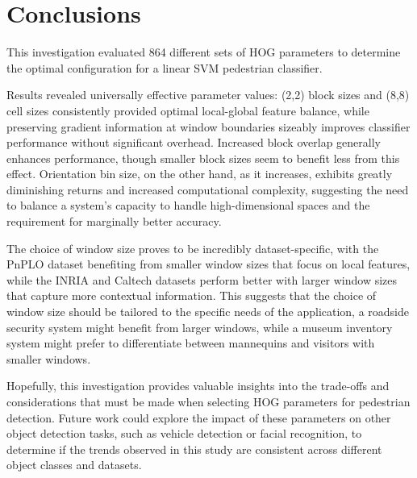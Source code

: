\section{Conclusions}

This investigation evaluated 864 different sets of HOG parameters to determine the optimal configuration for a linear SVM pedestrian classifier.

Results revealed universally effective parameter values: (2,2) block sizes and (8,8) cell sizes consistently provided optimal local-global feature balance, while preserving gradient information at window boundaries sizeably improves classifier performance without significant overhead. Increased block overlap generally enhances performance, though smaller block sizes seem to benefit less from this effect. Orientation bin size, on the other hand, as it increases, exhibits greatly diminishing returns and increased computational complexity, suggesting the need to balance a system's capacity to handle high-dimensional spaces and the requirement for marginally better accuracy.

The choice of window size proves to be incredibly dataset-specific, with the PnPLO dataset benefiting from smaller window sizes that focus on local features, while the INRIA and Caltech datasets perform better with larger window sizes that capture more contextual information. This suggests that the choice of window size should be tailored to the specific needs of the application, a roadside security system might benefit from larger windows, while a museum inventory system might prefer to differentiate between mannequins and visitors with smaller windows.

Hopefully, this investigation provides valuable insights into the trade-offs and considerations that must be made when selecting HOG parameters for pedestrian detection. Future work could explore the impact of these parameters on other object detection tasks, such as vehicle detection or facial recognition, to determine if the trends observed in this study are consistent across different object classes and datasets.

